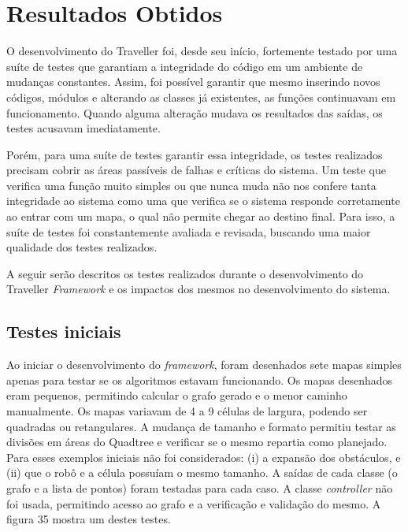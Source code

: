 \chapter[Resultados obtidos]{Resultados Obtidos}

O desenvolvimento do Traveller foi, desde seu início, fortemente testado por uma suíte de testes que garantiam a integridade do código em um ambiente de mudanças constantes. Assim, foi possível garantir que mesmo inserindo novos códigos, módulos e alterando as classes já existentes, as funções continuavam em funcionamento. Quando alguma alteração mudava os resultados das saídas, os testes acusavam imediatamente.

Porém, para uma suíte de testes garantir essa integridade, os testes realizados precisam cobrir as áreas passíveis de falhas e críticas do sistema. Um teste que verifica uma função muito simples ou que nunca muda não nos confere tanta integridade ao sistema como uma que verifica se o sistema responde corretamente ao entrar com um mapa, o qual não permite chegar ao destino final. Para isso, a suíte de testes foi constantemente avaliada e revisada, buscando uma maior qualidade dos testes realizados.

A seguir serão descritos os testes realizados durante o desenvolvimento do Traveller \textit{Framework} e os impactos dos mesmos no desenvolvimento do sistema.

\section{Testes iniciais}

Ao iniciar o desenvolvimento do \textit{framework}, foram desenhados sete mapas simples apenas para testar se os algoritmos estavam funcionando. Os mapas desenhados eram pequenos, permitindo calcular o grafo gerado e o menor caminho manualmente. Os mapas variavam  de 4 a 9 células de largura, podendo ser quadradas ou retangulares. A mudança de tamanho e formato permitiu testar as divisões em áreas do Quadtree e verificar se o mesmo repartia como planejado. Para esses exemplos iniciais não foi considerados: (i) a expansão dos obstáculos, e (ii) que o robô e a célula possuíam o mesmo tamanho. A saídas de cada classe (o grafo e a lista de pontos) foram testadas para cada caso. A classe \textit{controller} não foi usada, permitindo acesso ao grafo e a verificação e validação do mesmo. A figura 35 mostra um destes testes.


